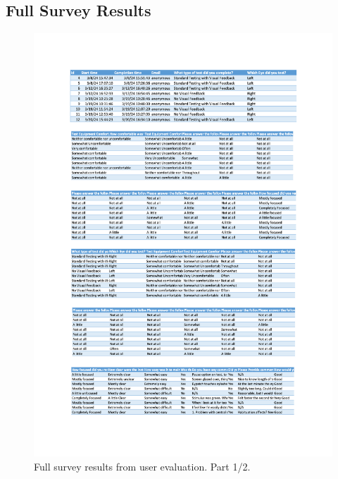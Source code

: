 \documentclass{l4proj}
\begin{document}
\begin{appendices}
\subsection{Full Survey Results} \label{appendix:full_survey_results}
\begin{figure}[htbp]
    \centering
    \includegraphics[page=1,width=1\linewidth]{dissertation/images/Full results.pdf}   
    \caption{Full survey results from user evaluation. Part 1/2.}
\end{figure}
\begin{figure}[htbp]
    \centering

\end{figure}
\end{appendices}
\end{document}
